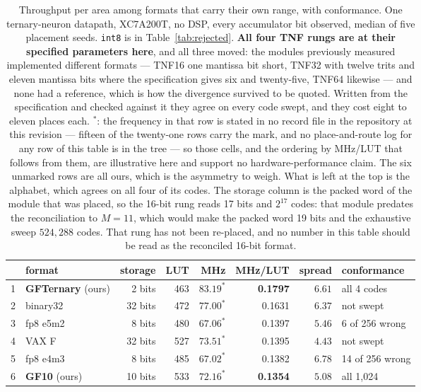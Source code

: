 \documentclass[11pt]{article}
\theoremstyle{definition}
\begin{document}
\begin{table}[t]\centering
\caption{Throughput per area among formats that carry their own range, with
conformance. One ternary-neuron datapath, XC7A200T, no DSP, every accumulator
bit observed, median of five placement seeds. \texttt{int8} is in
Table~\ref{tab:rejected}. \textbf{All four TNF rungs are at their specified
parameters here}, and all three moved: the modules previously measured
implemented different formats --- TNF16 one mantissa bit short, TNF32 with twelve
trits and eleven mantissa bits where the specification gives six and
twenty-five, TNF64 likewise --- and none had a reference, which is how the
divergence survived to be quoted. Written from the specification and checked
against it they agree on every code swept, and they cost eight to eleven places
each. $^{\ast}$: the frequency in that row is stated in no record file in the
repository at this revision --- fifteen of the twenty-one rows carry the mark, and
no place-and-route log for any row of this table is in the tree --- so those cells,
and the ordering by MHz/LUT that follows from them, are illustrative here and
support no hardware-performance claim. The six unmarked rows are all ours, which
is the asymmetry to weigh. What is left at the top is the alphabet, which agrees on all four of its
codes. The storage column is the packed word of the module that was placed, so the
16-bit rung reads 17 bits and $2^{17}$ codes: that module predates the
reconciliation to $M = 11$, which would make the packed word 19 bits and the
exhaustive sweep $524{,}288$ codes. That rung has not been re-placed, and no
number in this table should be read as the reconciled 16-bit format.}
\label{tab:fullthroughput}
\small\setlength{\tabcolsep}{4pt}
\begin{tabular}{rlrrrrrl}
\toprule
& format & storage & LUT & MHz & MHz/LUT & spread & conformance \\
\midrule
1 & \textbf{GFTernary} (ours) & 2 bits & 463 & $83.19^{\ast}$ & \textbf{0.1797} & $6.61$ & all 4 codes \\
2 & binary32 & 32 bits & 472 & $77.00^{\ast}$ & 0.1631 & $6.37$ & not swept \\
3 & fp8 e5m2 & 8 bits & 480 & $67.06^{\ast}$ & 0.1397 & $5.46$ & 6 of 256 wrong \\
4 & VAX F & 32 bits & 527 & $73.51^{\ast}$ & 0.1395 & $4.43$ & not swept \\
5 & fp8 e4m3 & 8 bits & 485 & $67.02^{\ast}$ & 0.1382 & $6.78$ & 14 of 256 wrong \\
6 & \textbf{GF10} (ours) & 10 bits & 533 & $72.16^{\ast}$ & \textbf{0.1354} & $5.08$ & all 1{,}024 \\

\end{tabular}
\end{table}
\end{document}
